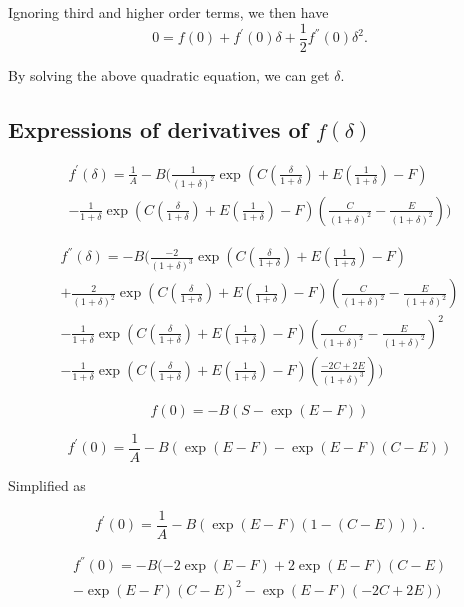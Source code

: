 \documentclass[12pt]{article}
\begin{document}
{Ignoring third and higher order terms, we then have
\begin{equation}\label{eqn:31}
0=f(0)+f^{'}(0)\delta+\frac{1}{2}f^{''}(0)\delta^{2}.
\end{equation}

By solving the above quadratic equation, we can get $\delta$.

\subsection{Expressions of derivatives of $f(\delta)$}

\begin{eqnarray}\label{eqn:32}
f^{'}(\delta)=\frac{1}{A}-B(\frac{1}{(1+\delta)^{2}}\exp(C (\frac{\delta}{1+\delta})+E(\frac{1}{1+
\delta})-F) \\ \nonumber
-\frac{1}{1+\delta}\exp(C (\frac{\delta}{1+\delta})+E(\frac{1}{1+\delta})-F)(\frac{C}{(1+\delta)^{2}}-\frac{E}{(1+\delta)^{2}}))
\end{eqnarray}


\begin{eqnarray}\label{eqn:33}
f^{''}(\delta)=-B(\frac{-2}{(1+\delta)^{3}}\exp(C (\frac{\delta}{1+\delta})+E(\frac{1}{1+\delta})-F) \\ \nonumber
+\frac{2}{(1+\delta)^{2}}\exp(C (\frac{\delta}{1+\delta})+E(\frac{1}{1+\delta})-F)(\frac{C}{(1+\delta)^{2}}-\frac{E}{(1+\delta)^{2}}) \\ \nonumber
-\frac{1}{1+\delta}\exp(C (\frac{\delta}{1+\delta})+E(\frac{1}{1+\delta})-F)(\frac{C}{(1+\delta)^{2}}-\frac{E}{(1+\delta)^{2}})^{2} \\ \nonumber
-\frac{1}{1+\delta}\exp(C (\frac{\delta}{1+\delta})+E(\frac{1}{1+\delta})-F)(\frac{-2C+2E}{(1+\delta)^{3}}))
\end{eqnarray}


\begin{equation}\label{eqn:34}
f(0)=-B(S-\exp(E-F))
\end{equation}

\begin{equation}\label{eqn:35}
f^{'}(0)=\frac{1}{A}-B(\exp(E-F)-\exp(E-F)(C-E))
\end{equation}

Simplified as 

\begin{equation}\label{eqn:36}
f^{'}(0)=\frac{1}{A}-B(\exp(E-F)(1-(C-E))).
\end{equation}

\begin{eqnarray}\label{eqn:37}
f^{''}(0)=-B(-2\exp(E-F)+2\exp(E-F)(C-E) \\ \nonumber
-\exp(E-F)(C-E)^{2}-\exp(E-F)(-2C+2E))
\end{eqnarray}

}
\end{document}
